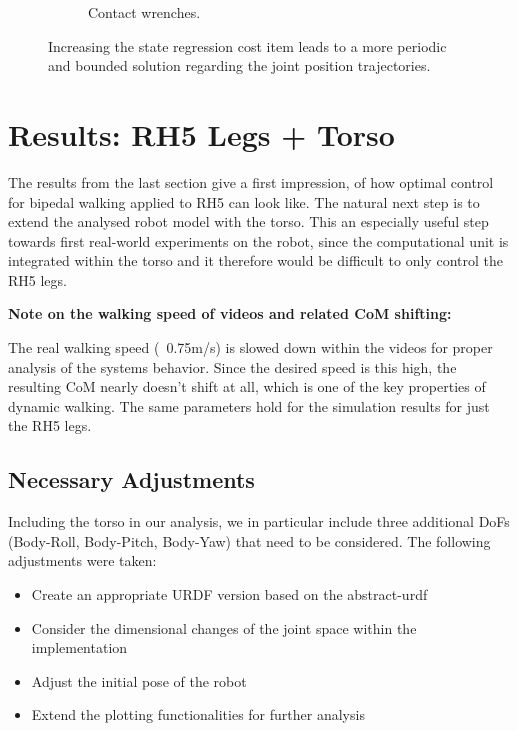 \begin{figure}[h!]
\begin{subfigure}{.7\textwidth}
\caption{Contact wrenches.}
\end{subfigure}
\caption{Increasing the state regression cost item leads to a more periodic and bounded solution regarding the joint position trajectories.}
\label{fig:rh5_periodic}
\centering
\end{figure}



\section{Results: RH5 Legs + Torso}
The results from the last section give a first impression, of how optimal control for bipedal walking applied to RH5 can look like. The natural next step is to extend the analysed robot model with the torso. This an especially useful step towards first real-world experiments on the robot, since the computational unit is integrated within the torso and it therefore would be difficult to only control the RH5 legs. 

\textbf{Note on the walking speed of videos and related CoM shifting:} 

The real walking speed (~0.75m/s) is slowed down within the videos for proper analysis of the systems behavior. Since the desired speed is this high, the resulting CoM nearly doesn't shift at all, which is one of the key properties of dynamic walking. The same parameters hold for the simulation results for just the RH5 legs.  


\subsection{Necessary Adjustments}
Including the torso in our analysis, we in particular include three additional DoFs (Body-Roll, Body-Pitch, Body-Yaw) that need to be considered. The following adjustments were taken:
\begin{itemize}
\item Create an appropriate URDF version based on the abstract-urdf
\item Consider the dimensional changes of the joint space within the implementation
\item Adjust the initial pose of the robot
\item Extend the plotting functionalities for further analysis
\end{itemize}

